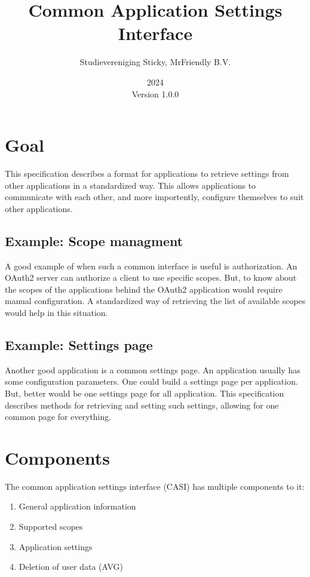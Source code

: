 \documentclass{article}
\title{Common Application Settings Interface}
\author{Studievereniging Sticky, MrFriendly B.V.}
\date{2024\\Version 1.0.0}
\begin{document}
    \maketitle
    \tableofcontents

    \section{Goal}
    \label{sec:goal}

    This specification describes a format for applications to retrieve
    settings from other applications in a standardized way.
    This allows applications to communicate with each other, and more importently,
    configure themselves to suit other applications.

    \subsection{Example: Scope managment}
    \label{subsec:example-scope-managment}

    A good example of when such a common interface is useful is
    authorization.
    An OAuth2 server can authorize a client to use specific scopes.
    But, to know about the scopes of the applications behind the OAuth2 application
    would require manual configuration.
    A standardized way of retrieving the list of available scopes would help in this situation.

    \subsection{Example: Settings page}
    \label{subsec:example-settings-page}

    Another good application is a common settings page.
    An application usually has some configuration parameters.
    One could build a settings page per application.
    But, better would be one settings page for all application.
    This specification describes methods for retrieving and setting such
    settings, allowing for one common page for everything.

    \section{Components}
    \label{sec:components}

    The common application settings interface (CASI) has multiple components to it:
    \begin{enumerate}
        \item General application information
        \item Supported scopes
        \item Application settings
        \item Deletion of user data (AVG)
    \end{enumerate}
\end{document}
